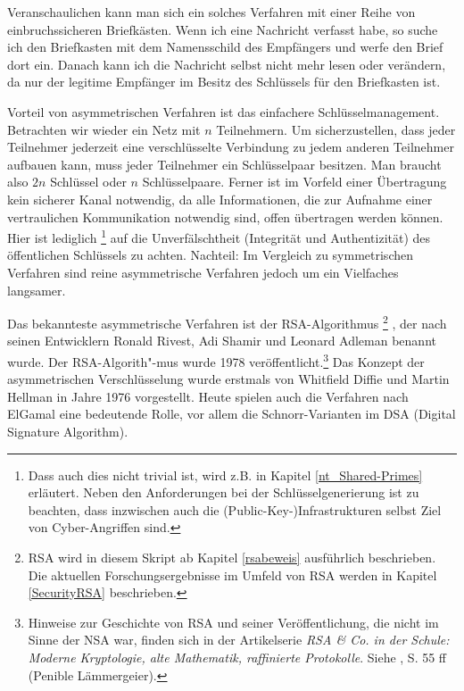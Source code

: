 \begin{refsegment}

Veranschaulichen kann man sich ein solches Verfahren mit einer
Reihe von einbruchssicheren Briefkästen. Wenn ich eine Nachricht
verfasst habe, so suche ich den Briefkasten mit dem
Namensschild des Empfängers und werfe den Brief dort ein. Danach kann ich die
Nachricht selbst nicht mehr lesen oder verändern, da nur der
legitime Empfänger im Besitz des Schlüssels für den Briefkasten
ist.

Vorteil von asymmetrischen Verfahren ist das einfachere
 Schlüsselmanagement. Betrachten wir
wieder ein Netz mit $n$ Teilnehmern. Um sicherzustellen, dass
jeder Teilnehmer jederzeit eine verschlüsselte Verbindung zu
jedem anderen Teilnehmer aufbauen kann, muss jeder Teilnehmer ein
Schlüsselpaar besitzen. Man braucht also $2n$ Schlüssel oder $n$
Schlüsselpaare. Ferner ist im Vorfeld einer Übertragung kein
sicherer Kanal notwendig, da alle Informationen, die zur Aufnahme
einer vertraulichen Kommunikation notwendig sind, offen
übertragen werden können. Hier ist lediglich%
\footnote{%
Dass auch dies nicht trivial ist, wird z.B. in Kapitel \ref{nt_Shared-Primes}
erläutert.
Neben den Anforderungen bei der Schlüsselgenerierung ist zu beachten, dass
inzwischen auch die (Public-Key-)Infrastrukturen selbst Ziel von
Cyber-Angriffen sind.
}
auf die Unverfälschtheit (Integrität und Authentizität)
 des öffentlichen Schlüssels zu achten.
Nachteil: Im Vergleich zu symmetrischen Verfahren sind reine
asymmetrische Verfahren jedoch um ein Vielfaches langsamer.

Das bekannteste asymmetrische Verfahren ist der 
RSA-Algorithmus%
\footnote{%
  RSA wird in diesem Skript ab Kapitel \ref{rsabeweis} ausführlich beschrieben.
  Die aktuellen Forschungsergebnisse im Umfeld von RSA werden in Kapitel
  \ref{SecurityRSA} beschrieben.
}%
, der nach seinen Entwicklern Ronald  Rivest,
Adi  Shamir und Leonard  Adleman
benannt wurde. Der RSA-Algorith"-mus wurde 1978 veröffentlicht.\footnote{%
  Hinweise zur Geschichte von RSA und seiner Veröffentlichung, die nicht im Sinne
  der NSA war, finden sich in der Artikelserie {\em RSA \& Co. in der Schule:
  Moderne Kryptologie, alte Mathematik, raffinierte Protokolle}.
  Siehe \cite{Witten2006}, S. 55 ff (\glqq Penible Lämmergeier\grqq).
}
Das Konzept der asymmetrischen Verschlüsselung wurde erstmals
von Whitfield Diffie   und
Martin  Hellman in Jahre 1976 vorgestellt.
Heute spielen auch die Verfahren nach
ElGamal  eine bedeutende Rolle, vor allem die
 Schnorr-Varianten im  DSA (Digital
Signature Algorithm).


\end{refsegment}
